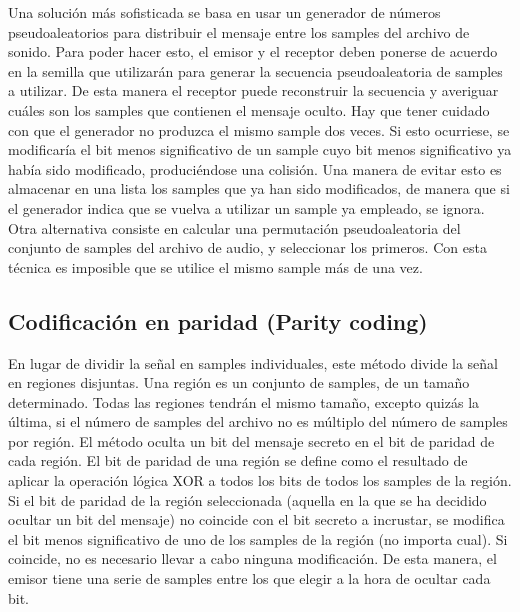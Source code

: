 \documentclass[12pt]{article}
\begin{document}
Una solución más sofisticada se basa en usar un generador de números pseudoaleatorios para distribuir el mensaje entre los samples del archivo de sonido. Para poder hacer esto, el emisor y el receptor deben ponerse de acuerdo en la semilla que utilizarán para generar la secuencia pseudoaleatoria de samples a utilizar. De esta manera el receptor puede reconstruir la secuencia y averiguar cuáles son los samples que contienen el mensaje oculto. Hay que tener cuidado con que el generador no produzca el mismo sample dos veces. Si esto ocurriese, se modificaría el bit menos significativo de un sample cuyo bit menos significativo ya había sido modificado, produciéndose una colisión. Una manera de evitar esto es almacenar en una lista los samples que ya han sido modificados, de manera que si el generador indica que se vuelva a utilizar un sample ya empleado, se ignora. Otra alternativa consiste en calcular una permutación pseudoaleatoria del conjunto de samples del archivo de audio, y seleccionar los primeros. Con esta técnica es imposible que se utilice el mismo sample más de una vez.

\subsection{Codificación en paridad (Parity coding)}

En lugar de dividir la señal en samples individuales, este método divide la señal en regiones disjuntas. Una región es un conjunto de samples, de un tamaño determinado. Todas las regiones tendrán el mismo tamaño, excepto quizás la última, si el número de samples del archivo no es múltiplo del número de samples por región. El método oculta un bit del mensaje secreto en el bit de paridad de cada región. El bit de paridad de una región se define como el resultado de aplicar la operación lógica XOR a todos los bits de todos los samples de la región. Si el bit de paridad de la región seleccionada (aquella en la que se ha decidido ocultar un bit del mensaje) no coincide con el bit secreto a incrustar, se modifica el bit menos significativo de uno de los samples de la región (no importa cual). Si coincide, no es necesario llevar a cabo ninguna modificación. De esta manera, el emisor tiene una serie de samples entre los que elegir a la hora de ocultar cada bit.
\end{document}
